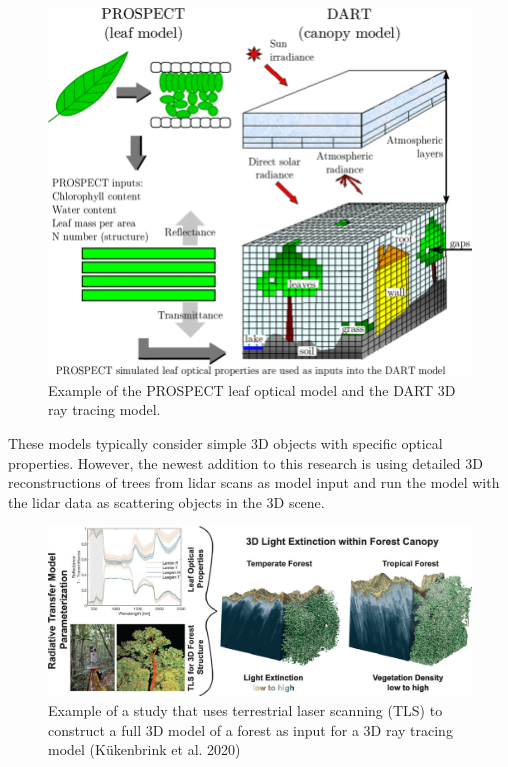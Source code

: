\documentclass[12pt,oneside]{book}
\begin{document}
\begin{figure}

{\centering \includegraphics[width=0.8\linewidth]{figures/chap3/f327_DART} 

}

\caption{Example of the PROSPECT leaf optical model and the DART 3D ray tracing model.}\label{fig:f327}
\end{figure}

These models typically consider simple 3D objects with specific optical
properties. However, the newest addition to this research is using
detailed 3D reconstructions of trees from lidar scans as model input and
run the model with the lidar data as scattering objects in the 3D scene.

\begin{figure}

{\centering \includegraphics[width=0.8\linewidth]{figures/chap3/f328_TLS_RT} 

}

\caption{Example of a study that uses terrestrial laser scanning (TLS) to construct a full 3D model of a forest as input for a 3D ray tracing model (Kükenbrink et al. 2020) }\label{fig:f328}
\end{figure}
\end{document}
